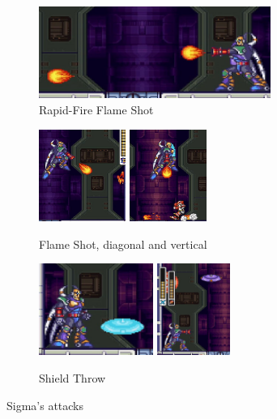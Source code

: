 \begin{figure}[htp]
	\centering
	\begin{subfigure}{\linewidth}
		\centering
		\includegraphics[height=3cm]{figures/X3/Doppler_stages/sigma_fball.jpg}
		\caption{Rapid-Fire Flame Shot}
	\end{subfigure}
	\begin{subfigure}{\linewidth}
		\centering
		\includegraphics[height=3cm]{figures/X3/Doppler_stages/sigma_fball_1.jpg}
		\includegraphics[height=3cm]{figures/X3/Doppler_stages/sigma_fball_2.jpg}
		\caption{Flame Shot, diagonal and vertical}
	\end{subfigure}
	\begin{subfigure}{\linewidth}
		\centering
		\includegraphics[height=3cm]{figures/X3/Doppler_stages/sigma_shield.jpg}
		\includegraphics[height=3cm]{figures/X3/Doppler_stages/sigma_shield_2.jpg}
		\caption{Shield Throw}
	\end{subfigure}
	\caption{Sigma's attacks}
\end{figure}
